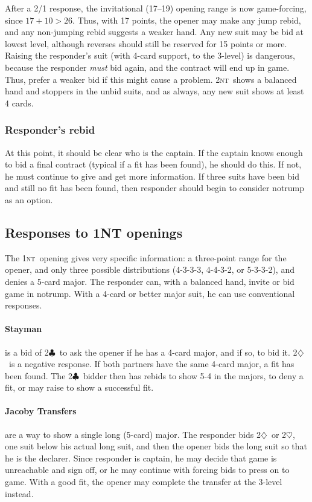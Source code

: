 \documentclass[11pt]{article}
\def\C{$\clubsuit$}
\def\D{$\diamondsuit$}
\def\H{$\heartsuit$}
\def\NT{\textsc{nt}}
\begin{document}
After a 2/1 response, the invitational (17--19) opening range is now
game-forcing, since $17+10>26$.  Thus, with 17 points, the opener may
make any jump rebid, and any non-jumping rebid suggests a weaker hand.
Any new suit may be bid at lowest level, although reverses should
still be reserved for 15 points or more.  Raising the responder's suit
(with 4-card support, to the 3-level) is dangerous, because the
responder \emph{must} bid again, and the contract will end up in game.
Thus, prefer a weaker bid if this might cause a problem.  2\NT\ shows
a balanced hand and stoppers in the unbid suits, and as always, any
new suit shows at least 4 cards.

\subsubsection{Responder's rebid}
At this point, it should be clear who is the captain.  If the captain
knows enough to bid a final contract (typical if a fit has been
found), he should do this.  If not, he must continue to give and get
more information.  If three suits have been bid and still no fit has
been found, then responder should begin to consider notrump as an
option.


\subsection{Responses to 1NT openings}
The 1\NT\ opening gives very specific information: a three-point
range for the opener, and only three possible distributions (4-3-3-3,
4-4-3-2, or 5-3-3-2), and denies a 5-card major.  The responder
can, with a balanced hand, invite or bid game in notrump.  With a 4-card
or better major suit, he can use conventional responses.

\paragraph{Stayman} is a bid of 2\C\ to ask the opener if he has a 
4-card major, and if so, to bid it.  2\D\ is a negative response.
If both partners have the same 4-card major, a fit has been found.
The 2\C\ bidder then has rebids to show 5-4 in the majors, to deny
a fit, or may raise to show a successful fit.

\paragraph{Jacoby Transfers} are a way to show a single long (5-card) major.
The responder bids 2\D\ or 2\H, one suit below his actual long suit,
and then the opener bids the long suit so that he is the declarer.
Since responder is captain, he may decide that game is unreachable and
sign off, or he may continue with forcing bids to press on to game.  With
a good fit, the opener may complete the transfer at the 3-level instead.
\end{document}
